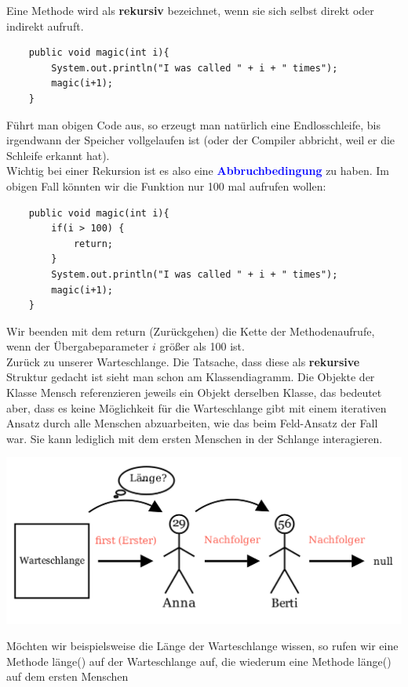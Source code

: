 \documentclass{article}
\begin{document}
\begin{defi}[Rekursion]
Eine Methode wird als \textbf{rekursiv} bezeichnet, wenn sie sich selbst direkt oder indirekt
aufruft.
\end{defi}
\bsp 
\begin{verbatim}
    public void magic(int i){
        System.out.println("I was called " + i + " times");
        magic(i+1);
    }
\end{verbatim}
Führt man obigen Code aus, so erzeugt man natürlich eine Endlosschleife, bis irgendwann der 
Speicher vollgelaufen ist (oder der Compiler abbricht, weil er die Schleife erkannt hat). \\
Wichtig bei einer Rekursion ist es also eine \textcolor{blue}{\textbf{Abbruchbedingung}} zu haben. 
Im obigen Fall könnten wir die Funktion nur 100 mal aufrufen wollen:
\begin{verbatim}
    public void magic(int i){
        if(i > 100) {
            return;
        }
        System.out.println("I was called " + i + " times");
        magic(i+1);
    }
\end{verbatim}
Wir beenden mit dem return (Zurückgehen) die Kette der Methodenaufrufe, wenn der Übergabeparameter $i$ größer als 100 ist. \\ 
Zurück zu unserer Warteschlange. Die Tatsache, dass diese als \textbf{rekursive} Struktur 
gedacht ist sieht man schon am Klassendiagramm. Die Objekte der Klasse Mensch 
referenzieren jeweils ein Objekt derselben Klasse, 
das bedeutet aber, dass es keine Möglichkeit für die Warteschlange gibt mit einem iterativen 
Ansatz durch alle Menschen abzuarbeiten, wie das beim Feld-Ansatz der Fall war. Sie kann 
lediglich mit dem ersten Menschen in der Schlange interagieren. 
\begin{center}
    \includegraphics[scale = 0.25]{../media/linked_list_length.png}
\end{center}
Möchten wir beispielsweise die Länge der Warteschlange wissen, so rufen wir eine Methode 
länge() auf der Warteschlange auf, die wiederum eine Methode länge() auf dem ersten Menschen
\end{document}
